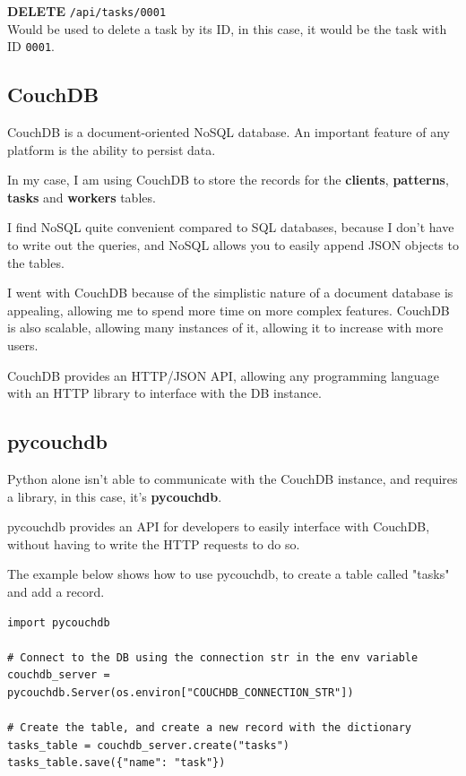 \textbf{DELETE} \texttt{/api/tasks/0001} \\
Would be used to delete a task by its ID,
in this case, it would be the task with ID \texttt{0001}.

\subsection{CouchDB}
CouchDB is a document-oriented NoSQL database. \cite{couchdb}
An important feature of any platform is the ability to persist data.

In my case, I am using CouchDB to store the records for the
\textbf{clients}, \textbf{patterns}, \textbf{tasks} and \textbf{workers} tables.

I find NoSQL quite convenient compared to SQL databases,
because I don't have to write out the queries,
and NoSQL allows you to easily append JSON objects to the tables.

I went with CouchDB because of the simplistic nature of
a document database is appealing,
allowing me to spend more time on more complex features.
CouchDB is also scalable, allowing many instances of it,
allowing it to increase with more users.

CouchDB provides an HTTP/JSON API, allowing any programming language
with an HTTP library to interface with the DB instance.

\subsection{pycouchdb}
Python alone isn't able to communicate with the CouchDB instance,
and requires a library, in this case, it's \textbf{pycouchdb}.

pycouchdb provides an API for developers to easily interface with
CouchDB, without having to write the HTTP requests to do so.

The example below shows how to use pycouchdb,
to create a table called "tasks" and add a record.

\begin{lstlisting}
import pycouchdb

# Connect to the DB using the connection str in the env variable
couchdb_server = pycouchdb.Server(os.environ["COUCHDB_CONNECTION_STR"])

# Create the table, and create a new record with the dictionary
tasks_table = couchdb_server.create("tasks")
tasks_table.save({"name": "task"})
\end{lstlisting}


